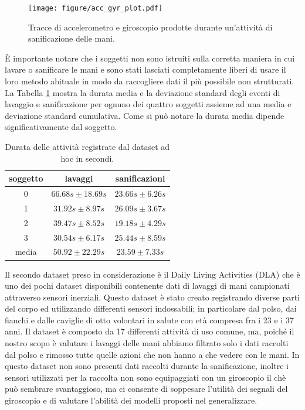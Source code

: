 \begin{figure}[!htb]
    \centering
    \texttt{[image: figure/acc\_gyr\_plot.pdf]}
    \caption{Tracce di accelerometro e giroscopio prodotte durante un'attività di sanificazione delle mani.}
    \label{fig:acc-gyro-plot}
\end{figure}

\`E importante notare che i soggetti non sono istruiti sulla corretta maniera in cui lavare o sanificare le mani e sono stati lasciati completamente liberi di usare il loro metodo abituale in modo da raccogliere dati il più possibile non strutturati. La Tabella \ref{tab:activity-duration} mostra la durata media e la deviazione standard degli eventi di lavaggio e sanificazione per ognuno dei quattro soggetti assieme ad una media e deviazione standard cumulativa. Come si può notare la durata media dipende significativamente dal soggetto.

\begin{table}
    \centering
    \begin{tabular}{c c c}
        \hline
        soggetto & lavaggi & sanificazioni  \\
        \hline
        0 & $66.68s \pm 18.69s$ & $23.66s \pm 6.26s$  \\
        1 & $31.92s \pm 8.97s$  & $26.09s \pm 3.67s$  \\
        2 & $39.47s \pm 8.52s$  & $19.18s \pm 4.29s$  \\
        3 & $30.54s \pm 6.17s$  & $25.44s \pm 8.59s$ \\
        \hline
        media & $50.92 \pm 22.29s$  & $23.59 \pm 7.33s$ \\
        \hline
    \end{tabular}
    \caption{Durata delle attività registrate dal dataset ad hoc in secondi.}
    \label{tab:activity-duration}
\end{table}

Il secondo dataset preso in considerazione è il Daily Living Activities (DLA) che è uno dei pochi dataset disponibili contenente dati di lavaggi di mani campionati attraverso sensori inerziali. Questo dataset è stato creato registrando diverse parti del corpo ed utilizzando differenti sensori indossabili; in particolare dal polso, dai fianchi e dalle caviglie di otto volontari in salute con età compresa fra i 23 e i 37 anni. Il dataset è composto da 17 differenti attività di uso comune, ma, poiché il nostro scopo è valutare i lavaggi delle mani abbiamo filtrato solo i dati raccolti dal polso e rimosso tutte quelle azioni che non hanno a che vedere con le mani. In questo dataset non sono presenti dati raccolti durante la sanificazione, inoltre i sensori utilizzati per la raccolta non sono equipaggiati con un giroscopio il chè può sembrare svantaggioso, ma ci consente di soppesare l'utilità dei segnali del giroscopio e di valutare l'abilità dei modelli proposti nel generalizzare.

